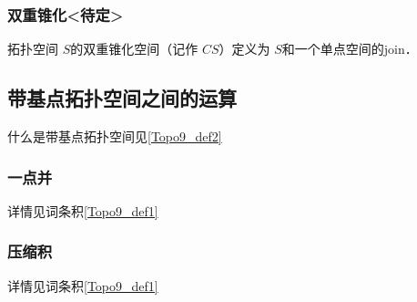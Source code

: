 
\subsubsection{双重锥化<待定>}

\begin{definition}{}
拓扑空间 $S$的双重锥化空间（记作 $C S$）定义为 $S$和一个单点空间的join．
\end{definition}


\subsection{带基点拓扑空间之间的运算}

什么是带基点拓扑空间见\autoref{Topo9_def2}~

\subsubsection{一点并}

详情见词条积\autoref{Topo9_def1}~


\subsubsection{压缩积}

详情见词条积\autoref{Topo9_def1}~





